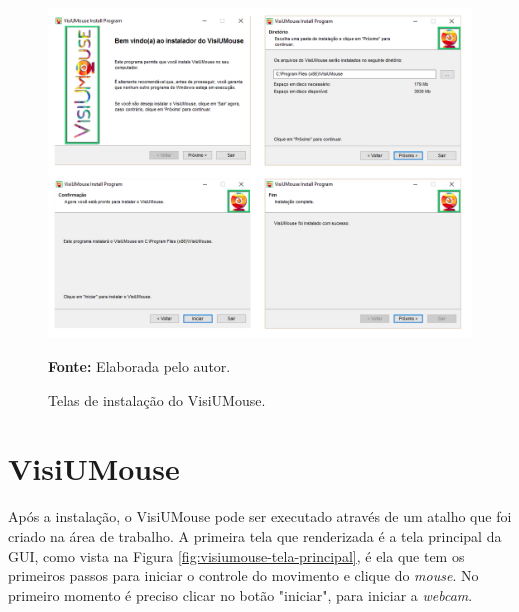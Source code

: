 \begin{figure}[H]
\caption{Telas de instalação do VisiUMouse.} 
\centering \includegraphics[scale=0.45]{img/software-instalador.png}

{\fontsize{11}{11}\selectfont \textbf{Fonte:} Elaborada pelo autor.}
\label{fig:visiumouse-instalador}
\end{figure}

\section{VisiUMouse}
Após a instalação, o VisiUMouse pode ser executado através de um atalho que foi criado na área de trabalho. A primeira tela que renderizada é a tela principal da GUI, como vista na Figura \ref{fig:visiumouse-tela-principal}, é ela que tem os primeiros passos para iniciar o controle do movimento e clique do \textit{mouse}. No primeiro momento é preciso clicar no botão "iniciar", para iniciar a \textit{webcam}.


